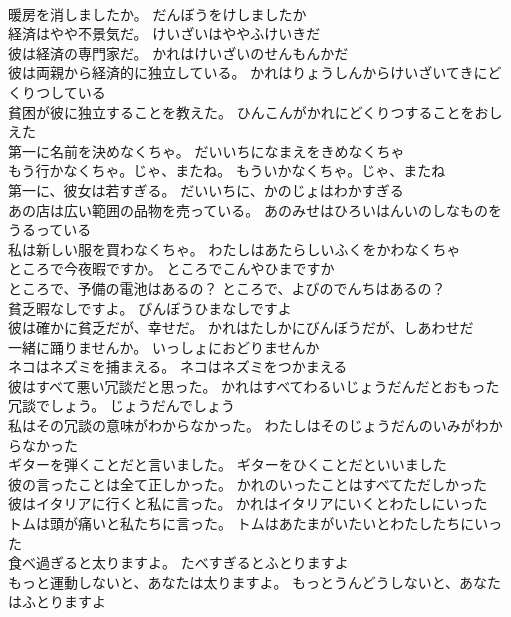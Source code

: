 \documentclass[8pt]{extreport}
\begin{document}
\begin{CJK}{UTF8}{min}
\\	暖房を消しましたか。	だんぼうをけしましたか 
\\	経済はやや不景気だ。	けいざいはややふけいきだ 
\\	彼は経済の専門家だ。	かれはけいざいのせんもんかだ 
\\	彼は両親から経済的に独立している。	かれはりょうしんからけいざいてきにどくりつしている 
\\	貧困が彼に独立することを教えた。	ひんこんがかれにどくりつすることをおしえた 
\\	第一に名前を決めなくちゃ。	だいいちになまえをきめなくちゃ 
\\	もう行かなくちゃ。じゃ、またね。	もういかなくちゃ。じゃ、またね 
\\	第一に、彼女は若すぎる。	だいいちに、かのじょはわかすぎる 
\\	あの店は広い範囲の品物を売っている。	あのみせはひろいはんいのしなものをうるっている 
\\	私は新しい服を買わなくちゃ。	わたしはあたらしいふくをかわなくちゃ 
\\	ところで今夜暇ですか。	ところでこんやひまですか 
\\	ところで、予備の電池はあるの？	ところで、よびのでんちはあるの？ 
\\	貧乏暇なしですよ。	びんぼうひまなしですよ 
\\	彼は確かに貧乏だが、幸せだ。	かれはたしかにびんぼうだが、しあわせだ 
\\	一緒に踊りませんか。	いっしょにおどりませんか 
\\	ネコはネズミを捕まえる。	ネコはネズミをつかまえる 
\\	彼はすべて悪い冗談だと思った。	かれはすべてわるいじょうだんだとおもった 
\\	冗談でしょう。	じょうだんでしょう 
\\	私はその冗談の意味がわからなかった。	わたしはそのじょうだんのいみがわからなかった 
\\	ギターを弾くことだと言いました。	ギターをひくことだといいました 
\\	彼の言ったことは全て正しかった。	かれのいったことはすべてただしかった 
\\	彼はイタリアに行くと私に言った。	かれはイタリアにいくとわたしにいった 
\\	トムは頭が痛いと私たちに言った。	トムはあたまがいたいとわたしたちにいった 
\\	食べ過ぎると太りますよ。	たべすぎるとふとりますよ 
\\	もっと運動しないと、あなたは太りますよ。	もっとうんどうしないと、あなたはふとりますよ 

\end{CJK}
\end{document}
